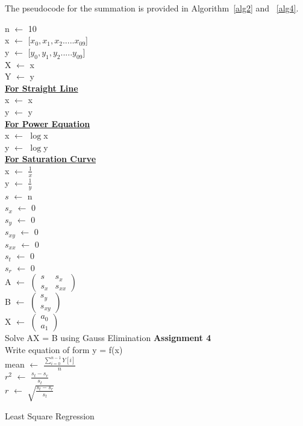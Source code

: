 \documentclass[titlepage, 11pt]{article}
\begin{document}
The pseudocode for the summation is provided in Algorithm~\ref{alg2} and ~\ref{alg4}.
\begin{center}
\begin{algorithm}[H]\label{alg2}

\SetAlgoLined
{
n $\gets$ 10 \\
x $\gets$ [$x_0,x_1,x_2.....x_{09}$] \\
y $\gets$ [$y_0,y_1,y_2.....y_{09}$] \\
X $\gets$ x \\
Y $\gets$ y \\
\underline{\textbf{For Straight Line}}\\ {
x $\gets$ x \\
y $\gets$ y \\
}
\underline{\textbf{For Power Equation}} \\{
x $\gets$ $\log$x \\
y $\gets$ $\log$y \\
}
\underline{\textbf{For Saturation Curve}} \\{
x $\gets$ $\frac{1}{x}$ \\
y $\gets$ $\frac{1}{y}$ \\
}
$s$ $\gets$ n \\
$s_x$ $\gets$ 0 \\ 
$s_y$ $\gets$ 0 \\ 
$s_{xy}$ $\gets$ 0 \\ 
$s_{xx}$ $\gets$ 0 \\ 
$s_t$ $\gets$ 0 \\
$s_r$ $\gets$ 0 \\
A $\gets$
$\begin{pmatrix}
s & s_x\\
s_x & s_{xx}
\end{pmatrix}$ \\
B $\gets$
$\begin{pmatrix}
s_y \\
s_{xy}
\end{pmatrix}$ \\
X $\gets$
$\begin{pmatrix}
a_0 \\
a_1
\end{pmatrix}$ \\
Solve AX = B using Gauss Elimination \textbf{Assignment 4}\\
Write equation of form y = f(x) \\
mean $\gets$ $\frac{\sum_{i=0}^{n-1}Y[i]}{n}$ \\
$r^2$ $\gets$ $\frac{s_t-s_r}{s_t}$\\
$r$ $\gets$ $\sqrt{\frac{s_t-s_r}{s_t}}$\\
}
 \caption{Least Square Regression}
\end{algorithm}       
\end{center}
\end{document}
